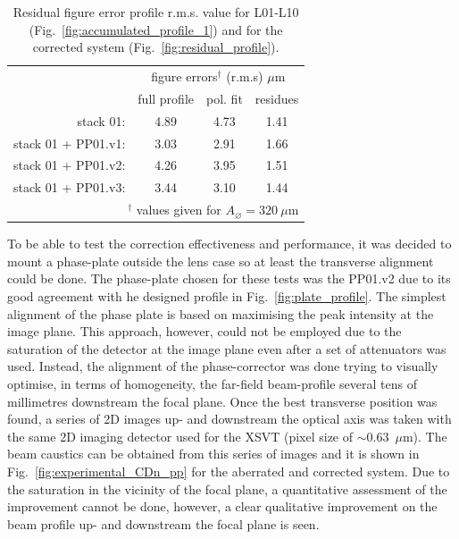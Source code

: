 \begin{refsection}
\begin{table}[t]
    \caption[Residual figure error profile r.m.s. value for L01-L10 and for the corrected system]{Residual figure error profile r.m.s. value for L01-L10 (Fig.~\ref{fig:accumulated_profile_1}) and for the corrected system (Fig.~\ref{fig:residual_profile}).}
    \centering
    \label{tab:corrected_xsvt}\small
    \begin{tabular}{rccc}
    \hline \hline
    &\multicolumn{3}{c}{figure errors$^\dagger$ (r.m.s) $\mu$m}\\ \cline{2-4}
    &full profile & pol. fit   & residues \\ \hline
    stack 01:           &4.89  &4.73  &1.41\\
    stack 01 + PP01.v1: &3.03  &2.91  &1.66\\
    stack 01 + PP01.v2: &4.26  &3.95  &1.51\\
    stack 01 + PP01.v3: &3.44  &3.10  &1.44\\
    \hline \hline
    \multicolumn{4}{r}{\footnotesize{$^\dagger$ values given for $A_{\diameter}=320~\mu\text{m}$}}     
    \end{tabular}
\end{table}

To be able to test the correction effectiveness and performance, it was decided to mount a phase-plate outside the lens case so at least the transverse alignment could be done. The phase-plate chosen for these tests was the PP01.v2 due to its good agreement with he designed profile in Fig.~\ref{fig:plate_profile}. The simplest alignment of the phase plate is based on maximising the peak intensity at the image plane. This approach, however, could not be employed due to the saturation of the detector at the image plane even after a set of attenuators was used. Instead, the alignment of the phase-corrector was done trying to visually optimise, in terms of homogeneity, the far-field beam-profile several tens of millimetres downstream the focal plane. Once the best transverse position was found, a series of 2D images up- and downstream the optical axis was taken with the same 2D imaging detector used for the XSVT (pixel size of $\sim$0.63~$\mu$m). The beam caustics can be obtained from this series of images and it is shown in Fig.~\ref{fig:experimental_CDn_pp} for the aberrated and corrected system. Due to the saturation in the vicinity of the focal plane, a quantitative assessment of the improvement cannot be done, however, a clear qualitative improvement on the beam profile up- and downstream the focal plane is seen.



\end{refsection}
